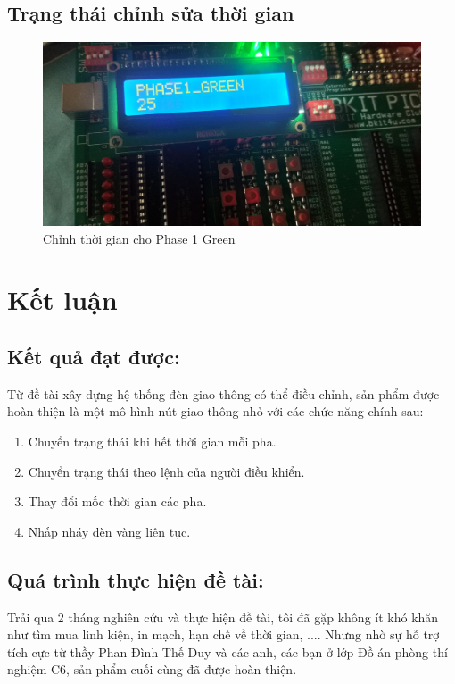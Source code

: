 \documentclass[a4paper]{article}
\begin{document}
\subsection{Trạng thái chỉnh sửa thời gian}
\begin{figure}[H]
\begin{center}
\includegraphics[width=12cm]{pic14.jpg}
\caption{Chỉnh thời gian cho Phase 1 Green}
\end{center}
\end{figure}

\section{Kết luận}
\subsection{Kết quả đạt được:}

Từ đề tài xây dựng hệ thống đèn giao thông có thể điều chỉnh, sản phẩm được hoàn thiện là một mô hình nút giao thông nhỏ với các chức năng chính sau:

\begin{enumerate}
	\item Chuyển trạng thái khi hết thời gian mỗi pha.
	\item Chuyển trạng thái theo lệnh của người điều khiển.
	\item Thay đổi mốc thời gian các pha.
	\item Nhấp nháy đèn vàng liên tục.
\end{enumerate}

\subsection{Quá trình thực hiện đề tài:}
Trải qua 2 tháng nghiên cứu và thực hiện đề tài, tôi đã gặp không ít khó khăn như tìm mua linh kiện, in mạch, hạn chế về thời gian, .... Nhưng nhờ sự hỗ trợ tích cực từ thầy Phan Đình Thế Duy và các anh, các bạn ở lớp Đồ án phòng thí nghiệm C6, sản phẩm cuối cùng đã được hoàn thiện.
\end{document}
